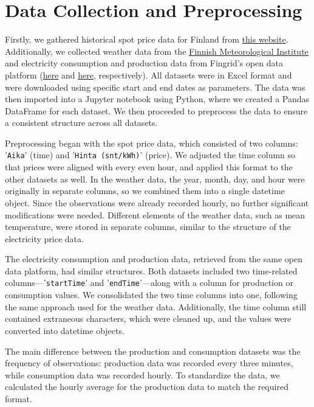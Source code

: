 \documentclass{article}
\numberwithin{equation}{section}
\begin{document}
\section{Data Collection and Preprocessing}
Firstly, we gathered historical spot price data for Finland from \href{https://porssisahko.net/tilastot}{this website}. Additionally, we collected weather data from the \href{https://www.ilmatieteenlaitos.fi/avoin-data/}{Finnish Meteorological Institute} and electricity consumption and production data from Fingrid's open data platform (\href{https://data.fingrid.fi/en/datasets/124}{here} and \href{https://data.fingrid.fi/en/datasets/192}{here}, respectively). All datasets were in Excel format and were downloaded using specific start and end dates as parameters. The data was then imported into a Jupyter notebook using Python, where we created a Pandas DataFrame for each dataset. We then proceeded to preprocess the data to ensure a consistent structure across all datasets.

Preprocessing began with the spot price data, which consisted of two columns: '\verb|Aika|' (time) and '\verb|Hinta (snt/kWh)|' (price). We adjusted the time column so that prices were aligned with every even hour, and applied this format to the other datasets as well. In the weather data, the year, month, day, and hour were originally in separate columns, so we combined them into a single datetime object. Since the observations were already recorded hourly, no further significant modifications were needed. Different elements of the weather data, such as mean temperature, were stored in separate columns, similar to the structure of the electricity price data.

The electricity consumption and production data, retrieved from the same open data platform, had similar structures. Both datasets included two time-related columns—'\verb|startTime|' and '\verb|endTime|'—along with a column for production or consumption values. We consolidated the two time columns into one, following the same approach used for the weather data. Additionally, the time column still contained extraneous characters, which were cleaned up, and the values were converted into datetime objects.

The main difference between the production and consumption datasets was the frequency of observations: production data was recorded every three minutes, while consumption data was recorded hourly. To standardize the data, we calculated the hourly average for the production data to match the required format.
\end{document}
